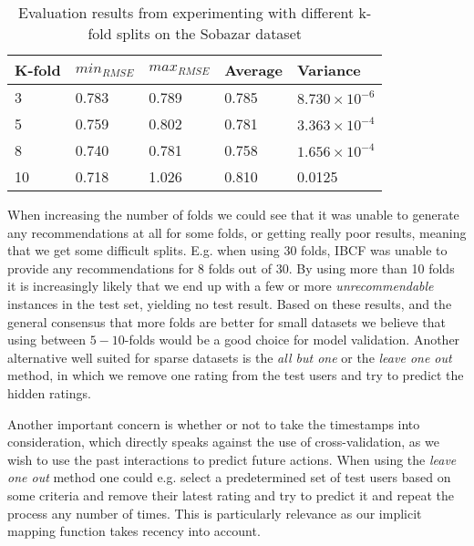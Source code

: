 \begin{table}[H]
\centering
\begin{tabular}{|l|l|l|l|l|}
\hline
K-fold & 	$min_{RMSE}$ 	&	$max_{RMSE}$ 	& Average 	& Variance 					\\ \hline
3	   & 	0.783 			& 	0.789 			& 0.785 	& $8.730 \times 10^{-6}$	\\ \hline
5	   & 	0.759			& 	0.802 			& 0.781 	& $3.363 \times 10^{-4}$ 	\\ \hline
8	   & 	0.740			& 	0.781			& 0.758 	& $1.656 \times 10^{-4}$ 	\\ \hline
10	   & 	0.718 			& 	1.026			& 0.810  	& 0.0125					\\ \hline
\end{tabular}
\caption{Evaluation results from experimenting with different k-fold splits on the Sobazar dataset}
\end{table}


When increasing the number of folds we could see that it was unable to generate
any recommendations at all for some folds, or getting really poor results, meaning
that we get some difficult splits. E.g. when using 30 folds, IBCF was unable to
provide any recommendations for 8 folds out of 30. By using more than 10 folds
it is increasingly likely that we end up with a few or more \emph{unrecommendable}
instances in the test set, yielding no test result. Based on these results,
and the general consensus that more folds are better for small datasets we
believe that using between $5-10$-folds would be a good choice for model validation.
Another alternative well suited for sparse datasets is the \emph{all but one} or the
\emph{leave one out} method, in which we remove one rating from the test users
and try to predict the hidden ratings.

Another important concern is whether or not to take the timestamps into consideration,
which directly speaks against the use of cross-validation, as we wish to use the past
interactions to predict future actions. When using the \emph{leave one out} method one
could e.g. select a predetermined set of test users based on some criteria and remove
their latest rating and try to predict it and repeat the process any number of times.
This is particularly relevance as our implicit mapping function takes recency into account.


